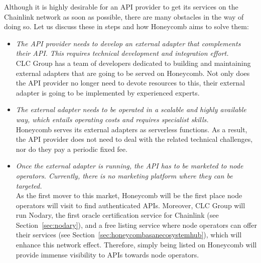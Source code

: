 \documentclass[12pt]{article}
\begin{document}
Although it is highly desirable for an API provider to get its services on the Chainlink network as soon as possible, there are many obstacles in the way of doing so. Let us discuss these in steps and how Honeycomb aims to solve them:
\begin{itemize}
	\item \textit{The API provider needs to develop an external adapter that complements their API. 
	This requires technical development and integration effort.}\medskip\\
	CLC Group has a team of developers dedicated to building and maintaining external adapters that are going to be served on Honeycomb.
	Not only does the API provider no longer need to devote resources to this, their external adapter is going to be implemented by experienced experts.
	
	\item \textit{The external adapter needs to be operated in a scalable and highly available way, which entails operating costs and requires specialist skills.}\medskip\\
	Honeycomb serves its external adapters as serverless functions.
	As a result, the API provider does not need to deal with the related technical challenges, nor do they pay a periodic fixed fee.
	
	\item \textit{Once the external adapter is running, the API has to be marketed to node operators.
	Currently, there is no marketing platform where they can be targeted.}\medskip\\
	As the first mover to this market, Honeycomb will be the first place node operators will visit to find authenticated APIs.
	Moreover, CLC Group will run Nodary, the first oracle certification service for Chainlink (see Section~\ref{sec:nodary}), and a free listing service where node operators can offer their services (see Section~\ref{sec:honeycombasanecosystemhub}), which will enhance this network effect.
	Therefore, simply being listed on Honeycomb will provide immense visibility to APIs towards node operators.
	

\end{itemize}
\end{document}
